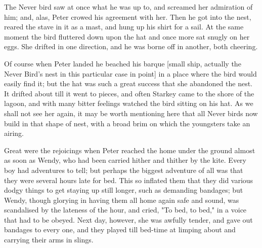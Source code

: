 The Never bird saw at once what he was up to, and screamed her admiration
of him; and, alas, Peter crowed his agreement with her. Then he got into
the nest, reared the stave in it as a mast, and hung up his shirt for a
sail. At the same moment the bird fluttered down upon the hat and once
more sat snugly on her eggs. She drifted in one direction, and he was
borne off in another, both cheering.


Of course when Peter landed he beached his barque [small ship, actually
the Never Bird's nest in this particular case in point] in a place where
the bird would easily find it; but the hat was such a great success that
she abandoned the nest. It drifted about till it went to pieces, and often
Starkey came to the shore of the lagoon, and with many bitter feelings
watched the bird sitting on his hat. As we shall not see her again, it may
be worth mentioning here that all Never birds now build in that shape of
nest, with a broad brim on which the youngsters take an airing.


Great were the rejoicings when Peter reached the home under the ground
almost as soon as Wendy, who had been carried hither and thither by the
kite. Every boy had adventures to tell; but perhaps the biggest adventure
of all was that they were several hours late for bed. This so inflated
them that they did various dodgy things to get staying up still longer,
such as demanding bandages; but Wendy, though glorying in having them all
home again safe and sound, was scandalised by the lateness of the hour,
and cried, "To bed, to bed," in a voice that had to be obeyed. Next day,
however, she was awfully tender, and gave out bandages to every one, and
they played till bed-time at limping about and carrying their arms in
slings.

